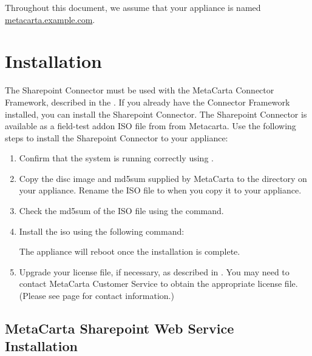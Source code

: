 \begin{changemargin}{1.5in}{0in}
Throughout this document, we assume that your appliance is named \\
\url{metacarta.example.com}.

\section{Installation}

The Sharepoint Connector must be used with the MetaCarta Connector
Framework, described in the . If you already have the Connector Framework installed, you can
install the Sharepoint Connector.  The Sharepoint Connector is
available as a field-test addon ISO file from from Metacarta. Use the
following steps to install the Sharepoint Connector to your appliance:

\begin{enumerate}

\item Confirm that the system is running correctly using
.

\item Copy the disc image and md5sum supplied by MetaCarta to the
 directory on your appliance. Rename the ISO file to
 when you copy it to your appliance.

\item Check the md5sum of the ISO file using the  command.

\item Install the iso using the following command:


The appliance will reboot once the installation is complete.

\item Upgrade your license file, if necessary, as described in
. You may need
to contact MetaCarta Customer Service to obtain the appropriate
license file. (Please see page \pageref{SupportContact} for contact
information.)
 
\end{enumerate}

\subsection{MetaCarta Sharepoint Web Service Installation}\label{SWService}


\end{changemargin}
